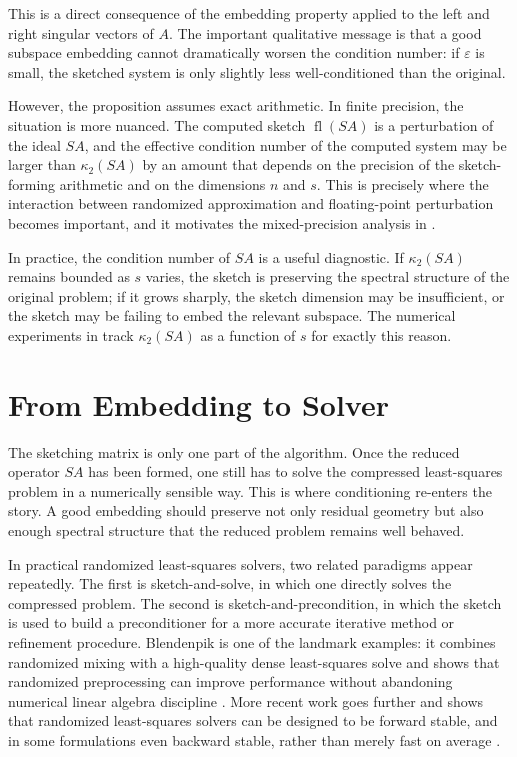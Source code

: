This is a direct consequence of the embedding property applied to the left and right singular vectors of \(A\). The important qualitative message is that a good subspace embedding cannot dramatically worsen the condition number: if \(\varepsilon\) is small, the sketched system is only slightly less well-conditioned than the original.

However, the proposition assumes exact arithmetic. In finite precision, the situation is more nuanced. The computed sketch \(\operatorname{fl}(SA)\) is a perturbation of the ideal \(SA\), and the effective condition number of the computed system may be larger than \(\kappa_2(SA)\) by an amount that depends on the precision of the sketch-forming arithmetic and on the dimensions \(n\) and \(s\). This is precisely where the interaction between randomized approximation and floating-point perturbation becomes important, and it motivates the mixed-precision analysis in .

In practice, the condition number of \(SA\) is a useful diagnostic. If \(\kappa_2(SA)\) remains bounded as \(s\) varies, the sketch is preserving the spectral structure of the original problem; if it grows sharply, the sketch dimension may be insufficient, or the sketch may be failing to embed the relevant subspace. The numerical experiments in  track \(\kappa_2(SA)\) as a function of \(s\) for exactly this reason.

\section{From Embedding to Solver}

The sketching matrix is only one part of the algorithm. Once the reduced operator \(SA\) has been formed, one still has to solve the compressed least-squares problem in a numerically sensible way. This is where conditioning re-enters the story. A good embedding should preserve not only residual geometry but also enough spectral structure that the reduced problem remains well behaved.

In practical randomized least-squares solvers, two related paradigms appear repeatedly. The first is sketch-and-solve, in which one directly solves the compressed problem. The second is sketch-and-precondition, in which the sketch is used to build a preconditioner for a more accurate iterative method or refinement procedure. Blendenpik is one of the landmark examples: it combines randomized mixing with a high-quality dense least-squares solve and shows that randomized preprocessing can improve performance without abandoning numerical linear algebra discipline \cite{avron2010blendenpik}. More recent work goes further and shows that randomized least-squares solvers can be designed to be forward stable, and in some formulations even backward stable, rather than merely fast on average \cite{epperly2024forwardstable,epperly2024stablels}.

